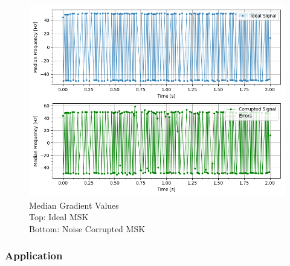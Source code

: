\begin{figure}[h!]
    \centering
    \includegraphics[width = \textwidth]{figs/error/medianGrad.png}
    \caption{\centering Median Gradient Values \\ Top: Ideal MSK \\ Bottom: Noise Corrupted MSK}
    \label{fig:medgrad}
\end{figure}


\pagebreak
\subsubsection{Application}


